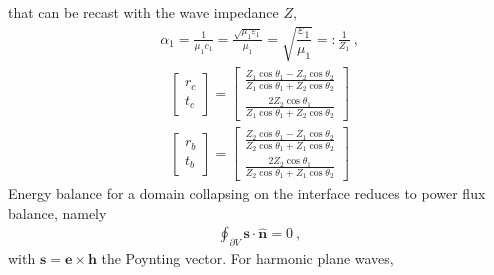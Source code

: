 \documentclass[letterpaper,10pt,italian]{jupyterBook}
\begin{document}
\sphinxAtStartPar
that can be recast with the wave impedance \(Z\),
\begin{equation*}
\begin{split}\alpha_1 = \frac{1}{\mu_1 c_1} = \frac{\sqrt{\mu_1 \varepsilon_1}}{\mu_1} = \sqrt{\dfrac{\varepsilon_1}{\mu_1}} =: \frac{1}{Z_1} \ ,\end{split}
\end{equation*}\begin{equation*}
\begin{split}
\begin{bmatrix} r_c \\ t_c \end{bmatrix} = \begin{bmatrix} \frac{Z_1 \cos \theta_1 - Z_2 \cos \theta_2}{Z_1 \cos \theta_1 + Z_2 \cos \theta_2} \\ \frac{2 Z_2 \cos \theta_1}{Z_1 \cos \theta_1 + Z_2 \cos \theta_2} \end{bmatrix}
\end{split}
\end{equation*}\begin{equation*}
\begin{split}
\begin{bmatrix} r_b \\ t_b \end{bmatrix} = \begin{bmatrix} \frac{Z_2 \cos \theta_1 - Z_1 \cos \theta_2}{Z_2 \cos \theta_1 + Z_1 \cos \theta_2} \\ \frac{2 Z_2 \cos \theta_1}{Z_2 \cos \theta_1 + Z_1 \cos \theta_2} \end{bmatrix}
\end{split}
\end{equation*}
\sphinxAtStartPar
{} Energy balance for a domain collapsing on the interface reduces to power flux balance, namely
\begin{equation*}
\begin{split}\oint_{\partial V} \mathbf{s} \cdot \hat{\mathbf{n}} = 0 \ ,\end{split}
\end{equation*}
\sphinxAtStartPar
with \(\mathbf{s} = \mathbf{e} \times \mathbf{h}\) the Poynting vector. For harmonic plane waves,
\end{document}
